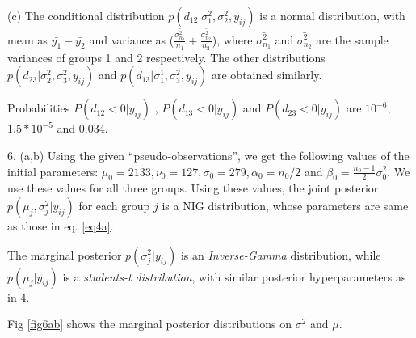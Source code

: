 \documentclass[11pt]{article}
\begin{document}
\par (c) The conditional distribution $p(d_{12} | \sigma^{2}_{1}, \sigma^{2}_{2}, y_{ij})$ is a normal distribution, with mean as $\bar{y_{1}} - \bar{y_{2}}$ and variance as ($\frac{\bar{\sigma^{2}_{n_1}}}{n_1}  + \frac{\bar{\sigma^{2}_{n_2}}}{n_2}$), where $\bar{\sigma^{2}_{n_1}}$ and $\bar{\sigma^{2}_{n_2}}$ are the sample variances of groups 1 and 2 respectively. The other distributions $p(d_{23} | \sigma^{2}_{2}, \sigma^{2}_{3}, y_{ij})$ and $p(d_{13} | \sigma^{1}_{1}, \sigma^{2}_{3}, y_{ij})$ are obtained similarly.  

\par Probabilities $P(d_{12} < 0 | y_{ij})$ , $P(d_{13} < 0 | y_{ij})$ and $P(d_{23} < 0 | y_{ij})$ are $10^{-6}$, $1.5 * 10^{-5}$ and 0.034. 


\par 6. (a,b) Using the given ``pseudo-observations'', we get the following values of the initial parameters: $\mu_0  = 2133, \nu_0 = 127, \sigma_0 = 279, \alpha_0 = n_0/2$ and $\beta_0 = \frac{n_0-1}{2} \sigma^{2}_0$. We use these values for all three groups. Using these values, the joint posterior $p(\mu_j, \sigma^{2}_j | y_{ij})$ for each group $j$ is a NIG distribution, whose parameters are same as those in eq. \ref{eq4a}. 

\par The marginal posterior $p(\sigma^{2}_j | y_{ij})$ is an \emph{Inverse-Gamma} distribution, while $p(\mu_j | y_{ij})$ is a \emph{students-t distribution}, with similar posterior hyperparameters as in 4.

\par Fig \ref{fig6ab} shows the marginal posterior distributions on $\sigma^2$ and $\mu$.
\end{document}
